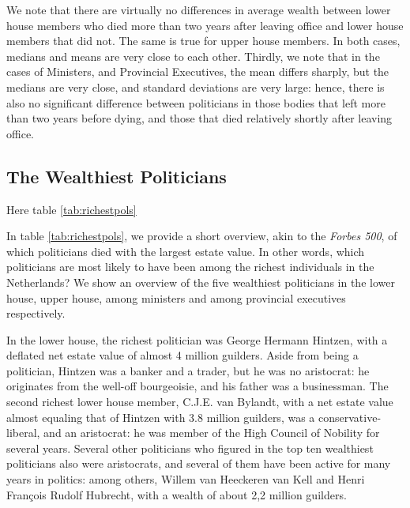     We note that there are virtually no differences in average wealth between lower house members who died more than two years after leaving office and lower house members that did not. The same is true for upper house members. In both cases, medians and means are very close to each other. Thirdly, we note that in the cases of Ministers, and Provincial Executives, the mean differs sharply, but the medians are very close, and standard deviations are very large: hence, there is also no significant difference between politicians in those bodies that left more than two years before dying, and those that died relatively shortly after leaving office.
    
\subsection{The Wealthiest Politicians}
    
    \begin{center}
    Here table \ref{tab:richestpols}
    \end{center}

    In table \ref{tab:richestpols}, we provide a short overview, akin to the \textit{Forbes 500}, of which politicians died with the largest estate value. In other words, which politicians are most likely to have been among the richest individuals in the Netherlands? We show an overview of the five wealthiest politicians in the lower house, upper house, among ministers and among provincial executives respectively. 
    
    In the lower house, the richest politician was George Hermann Hintzen, with a deflated net estate value of almost 4 million guilders. Aside from being a politician, Hintzen was a banker and a trader, but he was no aristocrat: he originates from the well-off bourgeoisie, and his father was a businessman. The second richest lower house member, C.J.E. van Bylandt, with a net estate value almost equaling that of Hintzen with 3.8 million guilders, was a conservative-liberal, and an aristocrat: he was member of the High Council of Nobility for several years. Several other politicians who figured in the top ten wealthiest politicians also were aristocrats, and several of them have been active for many years in politics: among others, Willem van Heeckeren van Kell and Henri François Rudolf Hubrecht, with a wealth of about 2,2 million guilders.
    
